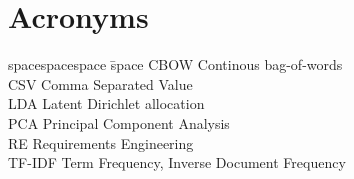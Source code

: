 \section*{Acronyms}

\begin{tabbing}
spacespacespace \= space \kill
CBOW \> Continous bag-of-words \\
CSV \> Comma Separated Value \\
LDA	\>	Latent Dirichlet allocation \\
PCA \> Principal Component Analysis\\
RE	\>	Requirements Engineering \\
TF-IDF \> Term Frequency, Inverse Document Frequency \\
\end{tabbing}